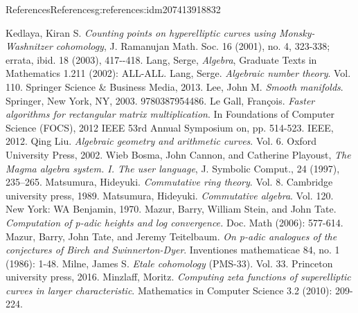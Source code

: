 \documentclass[oneside,10pt,]{book}
\numberwithin{equation}{section}
\begin{document}
\begin{references-chapter-numberless}{References}{}{References}{}{}{g:references:idm207413918832}
\begin{thebibliography}{9}
\hypertarget{x:biblio:bib-kedlaya-counting}{}Kedlaya, Kiran S. \textit{Counting points on hyperelliptic curves using Monsky-Washnitzer cohomology}, J. Ramanujan Math. Soc. 16 (2001), no. 4, 323-338; errata, ibid. 18 (2003), 417-{}-{}418.
\hypertarget{x:biblio:bib-lang-algebra}{}Lang, Serge,  \textit{Algebra}, Graduate Texts in Mathematics 1.211 (2002): ALL-ALL.
\hypertarget{x:biblio:bib-lang-algebraic-nt}{}Lang, Serge. \textit{Algebraic number theory}. Vol. 110. Springer Science \& Business Media, 2013.
\hypertarget{x:biblio:bib-lee-smooth}{}Lee, John M. \textit{Smooth manifolds}. Springer, New York, NY, 2003. 9780387954486.
\hypertarget{x:biblio:bib-le-gall}{}Le Gall, François. \textit{Faster algorithms for rectangular matrix multiplication}. In Foundations of Computer Science (FOCS), 2012 IEEE 53rd Annual Symposium on, pp. 514-523. IEEE, 2012.
\hypertarget{x:biblio:bib-liu}{}Qing Liu. \textit{Algebraic geometry and arithmetic curves}. Vol. 6. Oxford University Press, 2002.
\hypertarget{x:biblio:bib-magma}{}Wieb Bosma, John Cannon, and Catherine Playoust, \textit{The Magma algebra system. I. The user language}, J. Symbolic Comput., 24 (1997), 235–265.
\hypertarget{x:biblio:bib-matsumura}{}Matsumura, Hideyuki. \textit{Commutative ring theory}. Vol. 8. Cambridge university press, 1989.
\hypertarget{x:biblio:bib-matsumura-algebra}{}Matsumura, Hideyuki. \textit{Commutative algebra}. Vol. 120. New York: WA Benjamin, 1970.
\hypertarget{x:biblio:bib-mazur-stein-tate}{}Mazur, Barry, William Stein, and John Tate. \textit{Computation of p-adic heights and log convergence.} Doc. Math (2006): 577-614.
\hypertarget{x:biblio:bib-mtt}{}Mazur, Barry, John Tate, and Jeremy Teitelbaum. \textit{On p-adic analogues of the conjectures of Birch and Swinnerton-Dyer}. Inventiones mathematicae 84, no. 1 (1986): 1-48.
\hypertarget{x:biblio:bib-milne-etale}{}Milne, James S. \textit{Etale cohomology} (PMS-33). Vol. 33. Princeton university press, 2016.
\hypertarget{x:biblio:bib-minzlaff}{}Minzlaff, Moritz. \textit{Computing zeta functions of superelliptic curves in larger characteristic}. Mathematics in Computer Science 3.2 (2010): 209-224.

\end{thebibliography}
\end{references-chapter-numberless}
\end{document}
